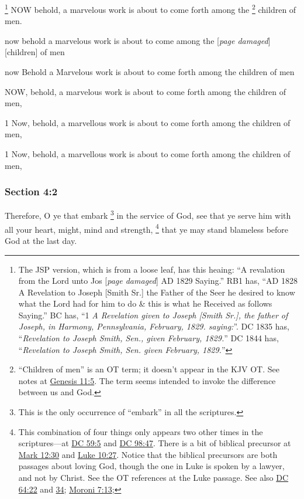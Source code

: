 			\footnote{%
				The JSP version, which is from a loose leaf, has this heaing: ``A revalation from the Lord unto Jos [\textit{page damaged}] AD 1829 Saying.'' RB1 has, ``AD 1828 A Revelation to Joseph [Smith Sr.] the Father of the Seer he desired to know what the Lord had for him to do \& this is what he Received as follows Saying.'' BC has, ``1 \textit{A Revelation given to Joseph [Smith Sr.], the father of Joseph, in Harmony, Pennsylvania, February, 1829. saying:}''. DC 1835 has, ``\textit{Revelation to Joseph Smith, Sen., given February, 1829.}'' DC 1844 has, ``\textit{Revelation to Joseph Smith, Sen. given February, 1829.}''
				}%
		NOW behold, a marvelous work is about to come forth among the
			\footnote{%
				``Children of men'' is an OT term; it doesn't appear in the KJV OT. See notes at \hyperref[GENESIS-11-5]{Genesis 11:5}. The term seems intended to invoke the difference between us and God.
				}%
		children of men.

		\begin{framed}
		\scriptsize
			\begin{compactdesc}
				\item[JSP] now behold a marvelous work is about to come among the [\textit{page damaged}] [children] of men
				\item[RB1] now Behold a Marvelous work is about to come forth among the children of men 
				\item[BC] NOW, behold, a marvelous work is about to come forth among the children of men, 
				\item[DC 1835] 1 Now, behold, a marvellous work is about to come forth among the children of men,
				\item[DC 1844] 1 Now, behold, a marvellous work is about to come forth among the children of men,
			\end{compactdesc}
		\end{framed}

	\subsubsection{Section 4:2} %
		\label{DC4-2}

		Therefore, O ye that embark%
			\footnote{%
				This is the only occurrence of ``embark'' in all the scriptures.
				}
		in the service of God, see that ye serve him with all your heart, might, mind and strength,%
			\footnote{%
				This combination of four things only appears two other times in the scriptures---at \hyperref[DC59-5]{DC 59:5} and \hyperref[DC98-47]{DC 98:47}. There is a bit of biblical precursor at \hyperref[MARK-12-30]{Mark 12:30} and \hyperref[LUKE-10-27]{Luke 10:27}. Notice that the biblical precursors are both passages about loving God, though the one in Luke is spoken by a lawyer, and not by Christ. See the OT references at the Luke passage. See also \hyperref[DC64-22]{DC 64:22} and \hyperref[DC64-34]{34}; \hyperref[MORONI-7-13]{Moroni 7:13};
				}
		that ye may stand blameless before God at the last day.

